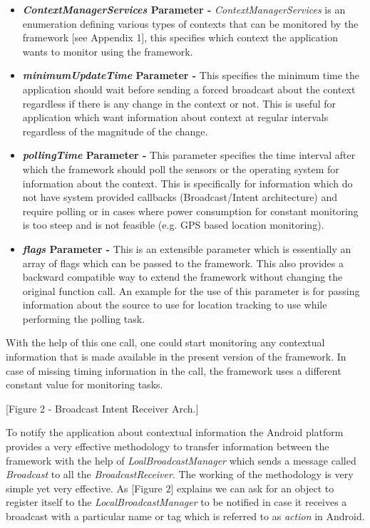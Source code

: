 \documentclass[12pt]{report}
\begin{document}
\begin{itemize}
\item \textbf{\textit{ContextManagerServices} Parameter - } \textit{ContextManagerServices} is an enumeration defining various types of contexts that can be monitored by the framework [see Appendix 1], this specifies which context the application wants to monitor using the framework.

\item \textbf{\textit{minimumUpdateTime} Parameter - } This specifies the minimum time the application should wait before sending a forced broadcast about the context regardless if there is any change in the context or not. This is useful for application which want information about context at regular intervals regardless of the magnitude of the change.

\item \textbf{\textit{pollingTime} Parameter - } This parameter specifies the time interval after which the framework should poll the sensors or the operating system for information about the context. This is specifically for information which do not have system provided callbacks (Broadcast/Intent architecture) and require polling or in cases where power consumption for constant monitoring is too steep and is not feasible (e.g. GPS based location monitoring).

\item \textbf{\textit{flags} Parameter - } This is an extensible parameter which is essentially an array of flags which can be passed to the framework. This also provides a backward compatible way to extend the framework without changing the original function call. An example for the use of this parameter is for passing information about the source to use for location tracking to use while performing the polling task.

\end{itemize}

With the help of this one call, one could start monitoring any contextual information that is made available in the present version of the framework. In case of missing timing information in the call, the framework uses a different constant value for monitoring tasks.

[Figure 2 - Broadcast Intent Receiver Arch.]

To notify the application about contextual information the Android platform provides a very effective methodology to transfer information between the framework with the help of \textit{LoalBroadcastManager} which sends a message called \textit{Broadcast} to all the \textit{BroadcastReceiver}. The working of the methodology is very simple yet very effective. As [Figure 2] explains we can ask for an object to register itself to the \textit{LocalBroadcastManager} to be notified in case it receives a broadcast with a particular name or tag which is referred to as \textit{action} in Android.
\end{document}
